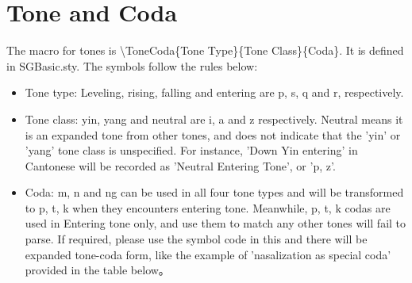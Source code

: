 \section{Tone and Coda}
The macro for tones is {\textbackslash}ToneCoda\{Tone Type\}\{Tone Class\}\{Coda\}. It is defined in SGBasic.sty. The symbols follow the rules below: \par
\begin{itemize}
	\item Tone type: Leveling, rising, falling and entering are p, s, q and r, respectively. 
	\item Tone class: yin, yang and neutral are i, a and z respectively. Neutral means it is an expanded tone from other tones, and does not indicate that the 'yin' or 'yang' tone class is unspecified. For instance, 'Down Yin entering' in Cantonese will be recorded as 'Neutral Entering Tone', or 'p, z'.
	\item Coda: m, n and ng can be used in all four tone types and will be transformed to p, t, k when they encounters entering tone. Meanwhile, p, t, k codas are used in Entering tone only, and use them to match any other tones will fail to parse. If required, please use the symbol code in this and there will be expanded tone-coda form, like the example of 'nasalization as special coda' provided in the table below。
\end{itemize}
\clearpage